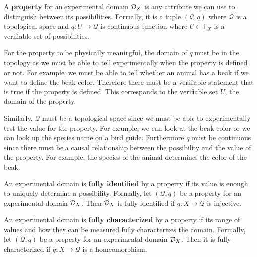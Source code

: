 \documentclass[11pt,letterpaper,fleqn]{memoir} %
\begin{document}
\begin{mathSection}
	\begin{defn}
		A \textbf{property} for an experimental domain $\mathcal{D}_X$ is any attribute we can use to distinguish between its possibilities. Formally, it is a tuple $(\mathcal{Q}, q)$ where $\mathcal{Q}$ is a topological space and $q : U \to \mathcal{Q}$ is continuous function where $U \in \mathsf{T}_X$ is a verifiable set of possibilities.
	\end{defn}
	\begin{justification}
		For the property to be physically meaningful, the domain of $q$ must be in the topology as we must be able to tell experimentally when the property is defined or not. For example, we must be able to tell whether an animal has a beak if we want to define the beak color. Therefore there must be a verifiable statement that is true if the property is defined. This corresponds to the verifiable set $U$, the domain of the property.
		
		Similarly, $\mathcal{Q}$ must be a topological space since we must be able to experimentally test the value for the property. For example, we can look at the beak color or we can look up the species name on a bird guide. Furthermore $q$ must be continuous since there must be a causal relationship between the possibility and the value of the property. For example, the species of the animal determines the color of the beak.
	\end{justification}
	\begin{defn}
		An experimental domain is \textbf{fully identified} by a property if its value is enough to uniquely determine a possibility. Formally, let $(\mathcal{Q}, q)$ be a property for an experimental domain $\mathcal{D}_X$. Then $\mathcal{D}_X$ is fully identified if $q: X \to \mathcal{Q}$ is injective.
	\end{defn}

	\begin{defn}
		An experimental domain is \textbf{fully characterized} by a property if its range of values and how they can be measured fully characterizes the domain. Formally, let $(\mathcal{Q}, q)$ be a property for an experimental domain $\mathcal{D}_X$. Then it is fully characterized if $q: X \to \mathcal{Q}$ is a homeomorphism.
	\end{defn}
\end{mathSection}
\end{document}
